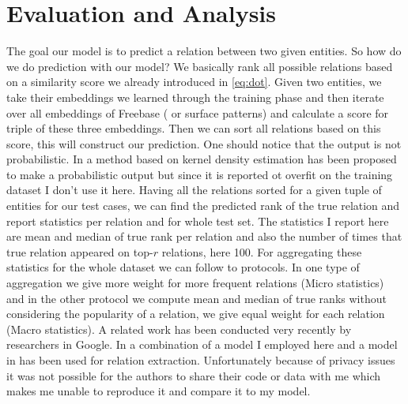 \section{Evaluation and Analysis}
\label{sec:textkb-exp-eval}

The goal our model is to predict a relation between
two given entities. So how do we do prediction with our model? We basically rank
all possible relations based on a similarity score we already introduced in
\eqref{eq:dot}. Given two entities, we take their embeddings we learned through
the training phase and then iterate over all embeddings of Freebase ( or
surface patterns) and calculate a score for triple of these three embeddings.
Then we can sort all relations based on this score, this will construct our
prediction. One should notice that the output is not probabilistic. In
\cite{Bordes2011} a method based on kernel density estimation has been proposed
to make a probabilistic output but since it is reported ot overfit on the
training dataset I don't use it here. 
Having all the relations sorted for a given tuple of entities for our test
cases, we can find the predicted rank of the true relation and report statistics
per relation and for whole test set. The statistics I report here are mean and
median of true rank per relation and also the number of times that true relation
appeared on top-$r$ relations, here 100. For aggregating these statistics for
the whole dataset we can follow to protocols. In one type of aggregation we
give more weight for more frequent relations (Micro statistics) and in the other
protocol we compute mean and median of true ranks without considering the
popularity of a relation, we give equal weight for each relation (Macro
statistics). A related work has been conducted very recently by
researchers in Google. In \cite{Weston2013} a combination of
     a model I employed here and a model in \cite{Weston2012} has been used for
     relation extraction. Unfortunately because of privacy issues it was not possible for
     the authors to share their code or data with me which makes me unable to
     reproduce it and compare it to my model.


